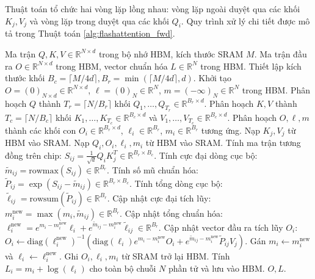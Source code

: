 \documentclass[10pt,a4paper]{article}
\begin{document}
Thuật toán tổ chức hai vòng lặp lồng nhau: vòng lặp ngoài duyệt qua các khối $K_j, V_j$ và vòng lặp trong duyệt qua các khối $Q_i$. Quy trình xử lý chi tiết được mô tả trong Thuật toán \ref{alg:flashattention_fwd}.

\begin{algorithm}[htbp]
\small
\caption{FlashAttention-1 Forward Pass (Thuật toán Chiều thuận)}
\label{alg:flashattention_fwd}
\begin{algorithmic}[1]
\Require Ma trận $Q, K, V \in \mathbb{R}^{N \times d}$ trong bộ nhớ HBM, kích thước SRAM $M$.
\Ensure Ma trận đầu ra $O \in \mathbb{R}^{N \times d}$ trong HBM, vector chuẩn hóa $L \in \mathbb{R}^N$ trong HBM.
\State Thiết lập kích thước khối $B_c = \lceil M / 4d \rceil, B_r = \min(\lceil M / 4d \rceil, d)$.
\State Khởi tạo $O = (0)_{N \times d} \in \mathbb{R}^{N \times d}$, $\ell = (0)_N \in \mathbb{R}^N$, $m = (-\infty)_N \in \mathbb{R}^N$ trong HBM.
\State Phân hoạch $Q$ thành $T_r = \lceil N / B_r \rceil$ khối $Q_1, \dots, Q_{T_r} \in \mathbb{R}^{B_r \times d}$.
\State Phân hoạch $K, V$ thành $T_c = \lceil N / B_c \rceil$ khối $K_1, \dots, K_{T_c} \in \mathbb{R}^{B_c \times d}$ và $V_1, \dots, V_{T_c} \in \mathbb{R}^{B_c \times d}$.
\State Phân hoạch $O, \ell, m$ thành các khối con $O_i \in \mathbb{R}^{B_r \times d}$, $\ell_i \in \mathbb{R}^{B_r}$, $m_i \in \mathbb{R}^{B_r}$ tương ứng.
 
    \State Nạp $K_j, V_j$ từ HBM vào SRAM.
     
        \State Nạp $Q_i, O_i, \ell_i, m_i$ từ HBM vào SRAM.
        \State Tính ma trận tương đồng trên chip: $S_{ij} = \frac{1}{\sqrt{d}} Q_i K_j^T \in \mathbb{R}^{B_r \times B_c}$.
        \State Tính cực đại dòng cục bộ: $\tilde{m}_{ij} = \text{rowmax}(S_{ij}) \in \mathbb{R}^{B_r}$.
        \State Tính số mũ chuẩn hóa: $\tilde{P}_{ij} = \exp(S_{ij} - \tilde{m}_{ij}) \in \mathbb{R}^{B_r \times B_c}$.
        \State Tính tổng dòng cục bộ: $\tilde{\ell}_{ij} = \text{rowsum}(\tilde{P}_{ij}) \in \mathbb{R}^{B_r}$.
        \State Cập nhật cực đại tích lũy: $m_i^{\text{new}} = \max(m_i, \tilde{m}_{ij}) \in \mathbb{R}^{B_r}$.
        \State Cập nhật tổng chuẩn hóa: $\ell_i^{\text{new}} = e^{m_i - m_i^{\text{new}}} \ell_i + e^{\tilde{m}_{ij} - m_i^{\text{new}}} \tilde{\ell}_{ij} \in \mathbb{R}^{B_r}$.
        \State Cập nhật vector đầu ra tích lũy $O_i$:
        \State \quad $O_i \gets \text{diag}(\ell_i^{\text{new}})^{-1} \left( \text{diag}(\ell_i) e^{m_i - m_i^{\text{new}}} O_i + e^{\tilde{m}_{ij} - m_i^{\text{new}}} \tilde{P}_{ij} V_j \right)$.
        \State Gán $m_i \gets m_i^{\text{new}}$ và $\ell_i \gets \ell_i^{\text{new}}$.
        \State Ghi $O_i, \ell_i, m_i$ từ SRAM trở lại HBM.
    \EndFor
\EndFor
\State Tính $L_i = m_i + \log(\ell_i)$ cho toàn bộ chuỗi $N$ phần tử và lưu vào HBM.
\State \Return $O, L$.
\end{algorithmic}
\end{algorithm}
\end{document}
